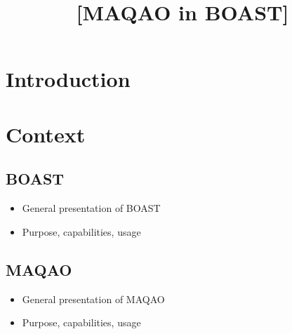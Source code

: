 \documentclass[11pt, a4paper, twoside]{montblanc2}
\begin{document}
\devnum{[5.11]}
\title{[MAQAO in BOAST]}
\version{[0.1]}
\deadline{[2017/01/16]}
\level{[PU]}
\nature{[O]}
\contributors{} %
\reviewers{} %

\maketitle

\begin{changelog}
\end{changelog}

\frontmatter

\begin{executive}
\end{executive}

\section{Introduction}

\section{Context}

\subsection{BOAST}
\begin{itemize}
  \item General presentation of BOAST
  \item Purpose, capabilities, usage
\end{itemize}

\subsection{MAQAO}
\begin{itemize}
  \item General presentation of MAQAO
  \item Purpose, capabilities, usage
\end{itemize}
\end{document}
